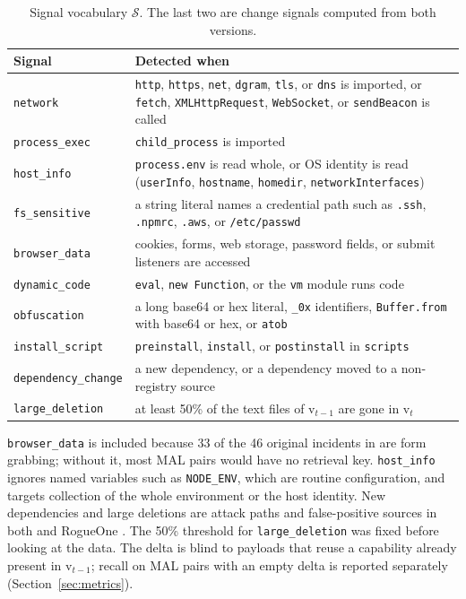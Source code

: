 \documentclass[a4paper,fleqn]{cas-dc}
\begin{document}
\begin{table}[t]
\caption{Signal vocabulary $\mathcal{S}$. The last two are change signals
computed from both versions.}
\label{tab:signals}
\small
\begin{tabular}{p{2.1cm} p{5.5cm}}
\hline
Signal & Detected when \\
\hline
\texttt{network} & \texttt{http}, \texttt{https}, \texttt{net}, \texttt{dgram}, \texttt{tls}, or \texttt{dns} is imported, or \texttt{fetch}, \texttt{XMLHttpRequest}, \texttt{WebSocket}, or \texttt{sendBeacon} is called \\
\texttt{process\_exec} & \texttt{child\_process} is imported \\
\texttt{host\_info} & \texttt{process.env} is read whole, or OS identity is read (\texttt{userInfo}, \texttt{hostname}, \texttt{homedir}, \texttt{networkInterfaces}) \\
\texttt{fs\_sensitive} & a string literal names a credential path such as \texttt{.ssh}, \texttt{.npmrc}, \texttt{.aws}, or \texttt{/etc/passwd} \\
\texttt{browser\_data} & cookies, forms, web storage, password fields, or submit listeners are accessed \\
\texttt{dynamic\_code} & \texttt{eval}, \texttt{new Function}, or the \texttt{vm} module runs code \\
\texttt{obfuscation} & a long base64 or hex literal, \texttt{\_0x} identifiers, \texttt{Buffer.from} with base64 or hex, or \texttt{atob} \\
\texttt{install\_script} & \texttt{preinstall}, \texttt{install}, or \texttt{postinstall} in \texttt{scripts} \\
\texttt{dependency\_change} & a new dependency, or a dependency moved to a non-registry source \\
\texttt{large\_deletion} & at least 50\% of the text files of $\mathrm{v}_{t-1}$ are gone in $\mathrm{v}_t$ \\
\hline
\end{tabular}
\end{table}

\texttt{browser\_data} is included because 33 of the 46 original incidents in
\citet{wyss2025evaluating} are form grabbing; without it, most MAL pairs would
have no retrieval key. \texttt{host\_info} ignores named variables such as
\texttt{NODE\_ENV}, which are routine configuration, and targets collection of
the whole environment or the host identity. New dependencies and large
deletions are attack paths and false-positive sources in both
\citet{wyss2025evaluating} and RogueOne \citep{sofaer2024rogueone}. The 50\%
threshold for \texttt{large\_deletion} was fixed before looking at the data.
The delta is blind to payloads that reuse a capability already present in
$\mathrm{v}_{t-1}$; recall on MAL pairs with an empty delta is reported
separately (Section~\ref{sec:metrics}).
\end{document}

